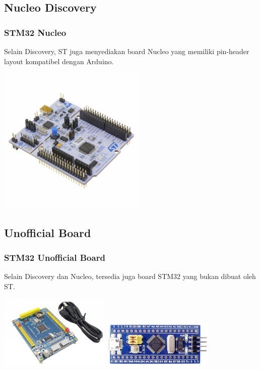 \documentclass[table,dvipsnames]{beamer}
\begin{document}
	\subsection{Nucleo Discovery}
	\begin{frame}
		\frametitle{STM32 Nucleo}
		\begin{block}{}
			Selain Discovery, ST juga menyediakan board Nucleo yang memiliki pin-header layout
			kompatibel dengan Arduino.
		\end{block}
		
		\begin{center}
			\includegraphics[width=200pt]{images/nucleo}
		\end{center}
	\end{frame}

	\subsection{Unofficial Board}
	\begin{frame}
		\frametitle{STM32 Unofficial Board}
		\begin{block}{}
			Selain Discovery dan Nucleo, tersedia juga board STM32 yang bukan dibuat oleh ST.
		\end{block}
		
		\begin{center}
			\includegraphics[width=150pt]{images/czmini}
			\includegraphics[width=150pt]{images/bluepill}
		\end{center}
	\end{frame}
\end{document}

